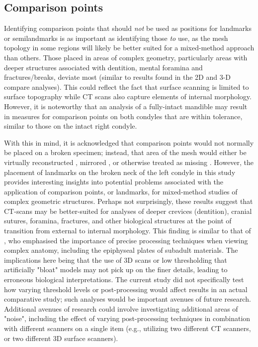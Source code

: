 \documentclass[review]{elsarticle}
\begin{document}
\subsection{Comparison points}

Identifying comparison points that should \textit{not} be used as positions for landmarks or semilandmarks is as important as identifying those \textit{to} use, as the mesh topology in some regions will likely be better suited for a mixed-method approach than others. Those placed in areas of complex geometry, particularly areas with deeper structures associated with dentition, mental foramina and fractures/breaks, deviate most (similar to results found in the 2D and 3-D compare analyses). This could reflect the fact that surface scanning is limited to surface topography while CT scans also capture elements of internal morphology. However, it is noteworthy that an analysis of a fully-intact mandible may result in measures for comparison points on both condyles that are within tolerance, similar to those on the intact right condyle.

With this in mind, it is acknowledged that comparison points would not normally be placed on a broken specimen; instead, that area of the mesh would either be virtually reconstructed \citep{RN11496,RN5889,Heid1,RN5903,RN5904}, mirrored \citep{RN11504}, or otherwise treated as missing \citep{RN11500,RN11497,RN11498,RN11499}. However, the placement of landmarks on the broken neck of the left condyle in this study provides interesting insights into potential problems associated with the application of comparison points, or landmarks, for mixed-method studies of complex geometric structures. Perhaps not surprisingly, these results suggest that CT-scans may be better-suited for analyses of deeper crevices (dentition), cranial sutures, foramina, fractures, and other biological structures at the point of transition from external to internal morphology. This finding is similar to that of \citet{RN8984}, who emphasised the importance of precise processing techniques when viewing complex anatomy, including the epiphyseal plates of subadult materials. The implications here being that the use of 3D scans or low thresholding that artificially "bloat" models may not pick up on the finer details, leading to erroneous biological interpretations. The current study did not specifically test how varying threshold levels or post-processing would affect results in an actual comparative study; such analyses would be important avenues of future research. Additional avenues of research could involve investigating additional areas of "noise", including the effect of varying post-processing techniques in combination with different scanners on a single item (e.g., utilizing two different CT scanners, or two different 3D surface scanners).
\end{document}
